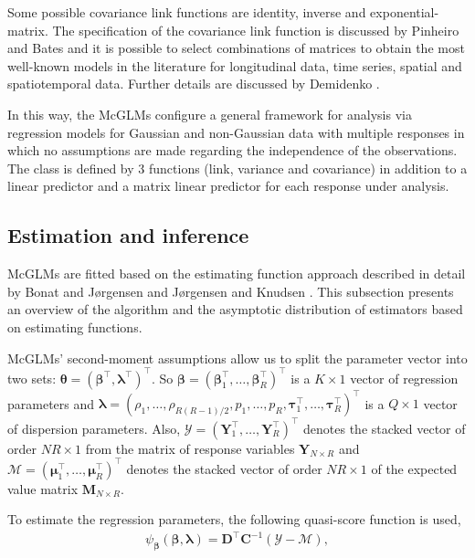 \documentclass[Review,sagev,times, doublespace]{sagej}
\begin{document}
Some possible covariance link functions are identity, inverse and exponential-matrix. The specification of the covariance link function is discussed by Pinheiro and Bates \cite{Pinheiro96} and it is possible to select combinations of matrices to obtain the most well-known models in the literature for longitudinal data, time series, spatial and spatiotemporal data. Further details are discussed by Demidenko \cite{Demidenko13}.

In this way, the McGLMs configure a general framework for analysis via regression models for Gaussian and non-Gaussian data with multiple responses in which no assumptions are made regarding the independence of the observations. The class is defined by 3 functions (link, variance and covariance) in addition to a linear predictor and a matrix linear predictor for each response under analysis.

\subsection{Estimation and inference}

McGLMs are fitted based on the estimating function approach described in detail by Bonat and Jørgensen \cite{Bonat16} and Jørgensen and Knudsen \cite{jorg04}. This subsection presents an overview of the algorithm and the asymptotic distribution of estimators based on estimating functions.

McGLMs' second-moment assumptions allow us to split the parameter vector into two sets: $\boldsymbol{\theta} = (\boldsymbol{\beta}^{\top}, \boldsymbol{\lambda}^{\top})^ {\top}$. So $\boldsymbol{\beta} = (\boldsymbol{\beta}_1^\top, \ldots, \boldsymbol{\beta}_R^\top)^\top$ is a $K \times 1$ vector of regression parameters and $\boldsymbol{\lambda} = (\rho_1, \ldots, \rho_{R(R-1)/2}, p_1, \ldots, p_R, \boldsymbol{\tau}_1^\top , \ldots, \boldsymbol{\tau}_R^\top)^\top$ is a $Q \times 1$ vector of dispersion parameters. Also, $\mathcal{Y} = (\boldsymbol{Y}_1^\top, \ldots, \boldsymbol{Y}_R^\top)^\top$ denotes the stacked vector of order $NR \times 1$ from the matrix of response variables $\boldsymbol{Y}_{N \times R}$ and $\mathcal{M} = (\boldsymbol{\mu}_1^\top, \ldots, \boldsymbol{\mu}_R^ \top)^\top$ denotes the stacked vector of order $NR \times 1$ of the expected value matrix $\boldsymbol{M}_{N \times R}$.

To estimate the regression parameters, the following quasi-score function \cite{Liang86} is used, 
$$
\begin{aligned}
  \psi_{\boldsymbol{\beta}}(\boldsymbol{\beta},
  \boldsymbol{\lambda}) = \boldsymbol{D}^\top
  \boldsymbol{C}^{-1}(\mathcal{Y} - \mathcal{M}),
\end{aligned}
$$
\end{document}
